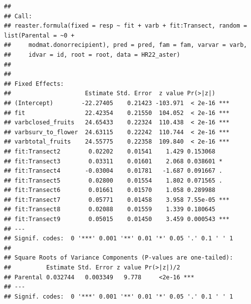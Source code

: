 \documentclass[
]{article}
\begin{document}
\begin{verbatim}
## 
## Call:
## reaster.formula(fixed = resp ~ fit + varb + fit:Transect, random = list(Parental = ~0 + 
##     modmat.donorrecipient), pred = pred, fam = fam, varvar = varb, 
##     idvar = id, root = root, data = HR22_aster)
## 
## 
## Fixed Effects:
##                     Estimate Std. Error  z value Pr(>|z|)    
## (Intercept)        -22.27405    0.21423 -103.971  < 2e-16 ***
## fit                 22.42354    0.21550  104.052  < 2e-16 ***
## varbclosed_fruits   24.65433    0.22324  110.438  < 2e-16 ***
## varbsurv_to_flower  24.63115    0.22242  110.744  < 2e-16 ***
## varbtotal_fruits    24.55775    0.22358  109.840  < 2e-16 ***
## fit:Transect2        0.02202    0.01541    1.429 0.153068    
## fit:Transect3        0.03311    0.01601    2.068 0.038601 *  
## fit:Transect4       -0.03004    0.01781   -1.687 0.091667 .  
## fit:Transect5        0.02800    0.01554    1.802 0.071565 .  
## fit:Transect6        0.01661    0.01570    1.058 0.289988    
## fit:Transect7        0.05771    0.01458    3.958 7.55e-05 ***
## fit:Transect8        0.02088    0.01559    1.339 0.180645    
## fit:Transect9        0.05015    0.01450    3.459 0.000543 ***
## ---
## Signif. codes:  0 '***' 0.001 '**' 0.01 '*' 0.05 '.' 0.1 ' ' 1
## 
## Square Roots of Variance Components (P-values are one-tailed):
##          Estimate Std. Error z value Pr(>|z|)/2    
## Parental 0.032744   0.003349   9.778     <2e-16 ***
## ---
## Signif. codes:  0 '***' 0.001 '**' 0.01 '*' 0.05 '.' 0.1 ' ' 1
\end{verbatim}
\end{document}
